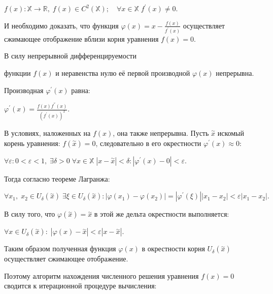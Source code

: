 \documentclass[a4paper]{article}
\begin{document}
{{{{{{{{{\begin{center}
 {{\(f(x):\mathbb{X}\rightarrow\mathbb{R},\; f(x) \in C^{2}(\mathbb{X});\quad\forall x \in \mathbb{X}\; f^{\prime}(x) \neq 0.\)}}
\end{center}

И необходимо доказать, что функция {{\(\varphi(x) = x - \frac{f(x)}{f^{\prime}(x)}\)}}
осуществляет сжимающее отображение вблизи корня уравнения
{\(f(x) = 0\)}.

В силу непрерывной дифференцируемости} функции {\(f(x)\)} и неравенства нулю её первой производной {\(\varphi(x)\)} непрерывна.

Производная {\(\varphi^{\prime}(x)\)} равна:

\begin{center}
 {\(\varphi^{\prime}(x) = \frac{f(x)f^{''}(x)}{\left( {f^{\prime}(x)} \right)^{2}}.\)}
\end{center}

В условиях, наложенных на
{\(f(x)\)}, она также непрерывна. Пусть {\(\overset{\sim}{x}\)}
искомый корень уравнения: {\(f(\overset{\sim}{x}) = 0\)},
следовательно в его окрестности {\(\varphi^{\prime}(x) \approx 0\)}:

\begin{center}
 {\(\forall\varepsilon:0 < \varepsilon < 1,\;\exists\delta > 0\;\forall x \in \mathbb{X}\;|x - \overset{\sim}{x}| < \delta:|\varphi^{\prime}(x) - 0| < \varepsilon.\)}
\end{center}

Тогда согласно теореме Лагранжа:

\begin{center}
 {\(\forall x_{1},\; x_{2} \in U_{\delta}(\overset{\sim}{x})\;\exists\xi \in U_{\delta}(\overset{\sim}{x}):|\varphi(x_{1}) - \varphi(x_{2})| = |\varphi^{\prime}(\xi)||x_{1} - x_{2}| < \varepsilon|x_{1} - x_{2}|.\)}
\end{center}

В силу того, что {\(\varphi(\overset{\sim}{x}) = \overset{\sim}{x}\)} в этой же дельта окрестности выполняется:

\begin{center}
 {\(\forall x \in U_{\delta}(\overset{\sim}{x}):\;|\varphi(x) - \overset{\sim}{x}| < \varepsilon|x - \overset{\sim}{x}|.\)}
\end{center}

Таким образом полученная функция {\(\varphi(x)\)} в окрестности корня {\(U_{\delta}(\overset{\sim}{x})\)} осуществляет сжимающее отображение.


Поэтому алгоритм нахождения численного решения уравнения {\(f(x) = 0\)} сводится к итерационной процедуре вычисления:

}}}}}}}}
\end{document}
